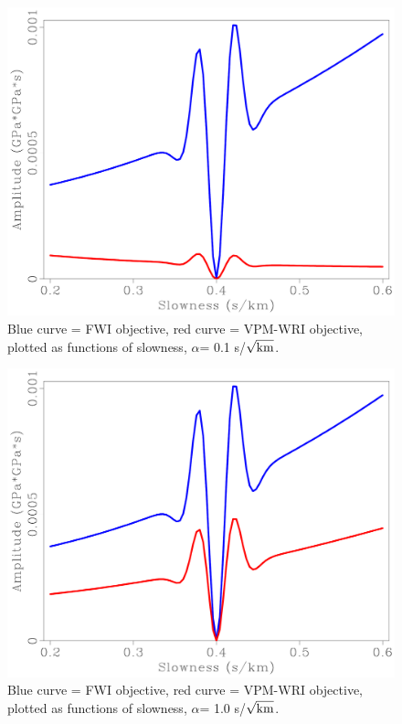 \begin{figure}[ht]   
\begin{center}
\includegraphics[width=\textwidth]{j0.pdf}
\caption{Blue curve = FWI objective, red curve =
  VPM-WRI objective, plotted as functions of slowness, $\alpha$= 0.1
  s/$\sqrt{\rm km}$.}
\label{fig:j0}
\end{center}
\end{figure}

\begin{figure}[ht]   
\begin{center}
\includegraphics[width=\textwidth]{j3.pdf}
\caption{Blue curve = FWI objective, red curve =
  VPM-WRI objective, plotted as functions of slowness, $\alpha$= 1.0
  s/$\sqrt{\rm km}$.}
\label{fig:j3}
\end{center}
\end{figure}